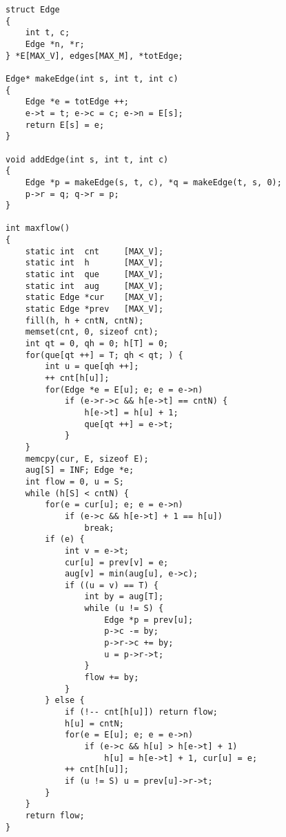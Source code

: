 \begin{lstlisting}
struct Edge
{
	int t, c;
	Edge *n, *r;
} *E[MAX_V], edges[MAX_M], *totEdge;

Edge* makeEdge(int s, int t, int c)
{
	Edge *e = totEdge ++;
	e->t = t; e->c = c; e->n = E[s]; 
	return E[s] = e;
}

void addEdge(int s, int t, int c)
{
	Edge *p = makeEdge(s, t, c), *q = makeEdge(t, s, 0);
	p->r = q; q->r = p;
}

int maxflow()
{
	static int	cnt		[MAX_V];
	static int	h		[MAX_V];
	static int	que		[MAX_V];
	static int	aug		[MAX_V];
	static Edge	*cur	[MAX_V];
	static Edge	*prev	[MAX_V];
	fill(h, h + cntN, cntN);
	memset(cnt, 0, sizeof cnt);
	int qt = 0, qh = 0; h[T] = 0;
	for(que[qt ++] = T; qh < qt; ) {
		int u = que[qh ++];
		++ cnt[h[u]];
		for(Edge *e = E[u]; e; e = e->n) 
			if (e->r->c && h[e->t] == cntN) {
				h[e->t] = h[u] + 1;
				que[qt ++] = e->t;
			}
	}
	memcpy(cur, E, sizeof E);
	aug[S] = INF; Edge *e;
	int flow = 0, u = S;
	while (h[S] < cntN) {
		for(e = cur[u]; e; e = e->n)
			if (e->c && h[e->t] + 1 == h[u])
				break;
		if (e) {
			int v = e->t;
			cur[u] = prev[v] = e;
			aug[v] = min(aug[u], e->c);
			if ((u = v) == T) {
				int by = aug[T];
				while (u != S) {
					Edge *p = prev[u];
					p->c -= by;
					p->r->c += by;
					u = p->r->t;
				}
				flow += by;
			}
		} else {
			if (!-- cnt[h[u]]) return flow;
			h[u] = cntN;
			for(e = E[u]; e; e = e->n)
				if (e->c && h[u] > h[e->t] + 1)
					h[u] = h[e->t] + 1, cur[u] = e;
			++ cnt[h[u]];
			if (u != S) u = prev[u]->r->t;
		}
	}
	return flow;
}
\end{lstlisting}
